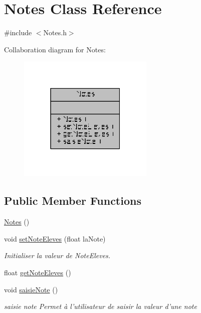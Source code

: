 \hypertarget{class_notes}{\section{Notes Class Reference}
\label{class_notes}
}


{\ttfamily \#include $<$Notes.\+h$>$}



Collaboration diagram for Notes\+:\nopagebreak
\begin{figure}[H]
\begin{center}
\leavevmode
\includegraphics[width=183pt]{class_notes__coll__graph}
\end{center}
\end{figure}
\subsection*{Public Member Functions}
\begin{DoxyCompactItemize}
\item 
\hyperlink{class_notes_ad031ee5187c64b36036a1486c2ec5d0b}{Notes} ()
\item 
void \hyperlink{class_notes_a7e1ffa4316f63d07e14c74542cdaf9bf}{set\+Note\+Eleves} (float la\+Note)
\begin{DoxyCompactList}\small\item\em Initialiser la valeur de Note\+Eleves. \end{DoxyCompactList}\item 
float \hyperlink{class_notes_a122f1318b07dd9155ab83d08dbc6708f}{get\+Note\+Eleves} ()
\item 
void \hyperlink{class_notes_a294991e8d30e40537a35803d64b655d3}{saisie\+Note} ()
\begin{DoxyCompactList}\small\item\em saisie note Permet à l'utilisateur de saisir la valeur d'une note \end{DoxyCompactList}\end{DoxyCompactItemize}


